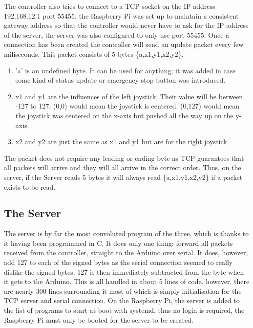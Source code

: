 \par
The controller also tries to connect to a TCP socket on the IP address 192.168.12.1
port 55455, the Raspberry Pi was set up to maintain a consistent gateway address
so that the controller would never have to ask for the IP address of the server,
the server was also configured to only use port 55455.
Once a connection has been created the controller will send an update packet every
few miliseconds. This packet consists of 5 bytes \{a,x1,y1,x2,y2\}.
\begin{enumerate}
  \item 'a' is an undefined byte. It can be used for anything; it was added in case
   some kind of status update or emergency stop button was introduced.
  \item x1 and y1 are the influences of the left joystick. Their value will be
  between -127 to 127. (0,0) would mean the joystick is centered. (0,127) would mean
  the joystick was centered on the x-axis but pushed all the way up on the y-axis.
  \item x2 and y2 are just the same as x1 and y1 but are for the right joystick.
\end{enumerate}
The packet does not require any leading or ending byte as TCP guarantees that all
packets will arrive and they will all arrive in the correct order. Thus, on the server,
if the Server reads 5 bytes it will always read \{a,x1,y1,x2,y2\} if a packet exists to be read.

\subsection{The Server}
\par The server is by far the most convoluted program of the three, which is thanks
to it having been programmed in C.
It does only one thing:
 forward all packets received from the controller, straight to the Arduino over serial.
It does, however, add 127 to each of the signed bytes as the serial connection
seemed to really dislike the signed bytes. 127 is then immediately subtracted from
the byte when it gets to the Arduino.
This is all handled in about 5 lines of code, however, there are nearly 300 lines
surrounding it most of which is simply initialisation for the TCP server and serial
connection.
On the Raspberry Pi, the server is added to the list of programs to start at boot
with systemd, thus no login is required, the Raspberry Pi must only be booted for
the server to be created.

